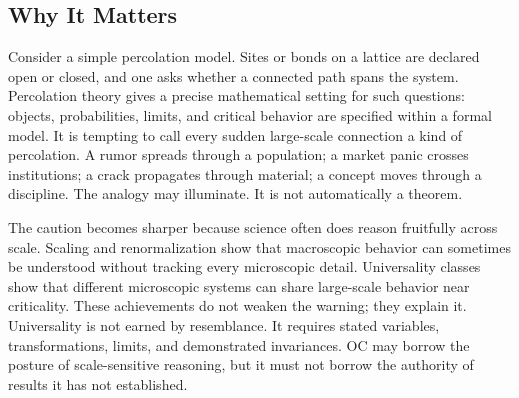 \documentclass[11pt,a4paper,openany]{book}
\begin{document}
\subsection{Why It Matters}
Consider a simple percolation model. Sites or bonds on a lattice are declared open or closed, and one asks whether a connected path spans the system. Percolation theory gives a precise mathematical setting for such questions: objects, probabilities, limits, and critical behavior are specified within a formal model. It is tempting to call every sudden large-scale connection a kind of percolation. A rumor spreads through a population; a market panic crosses institutions; a crack propagates through material; a concept moves through a discipline. The analogy may illuminate. It is not automatically a theorem. \cite{grimmett_percolation,goldenfeld_lectures}\par
The caution becomes sharper because science often does reason fruitfully across scale. Scaling and renormalization show that macroscopic behavior can sometimes be understood without tracking every microscopic detail. Universality classes show that different microscopic systems can share large-scale behavior near criticality. These achievements do not weaken the warning; they explain it. Universality is not earned by resemblance. It requires stated variables, transformations, limits, and demonstrated invariances. OC may borrow the posture of scale-sensitive reasoning, but it must not borrow the authority of results it has not established.\par
\end{document}
